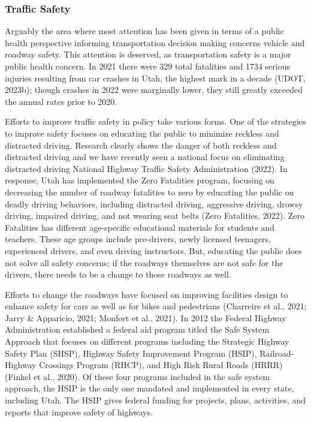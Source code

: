 \documentclass[
  letterpaper,
  authoryear,
  review,
  3p]{elsarticle}
\begin{document}
\hypertarget{traffic-safety}{%
\subsubsection{Traffic Safety}\label{traffic-safety}}

Arguably the area where most attention has been given in terms of a
public health perspective informing transportation decision making
concerns vehicle and roadway safety. This attention is deserved, as
transportation safety is a major public health concern. In 2021 there
were 329 total fatalities and 1734 serious injuries resulting from car
crashes in Utah, the highest mark in a decade (UDOT, 2023b); though
crashes in 2022 were marginally lower, they still greatly exceeded the
annual rates prior to 2020.

Efforts to improve traffic safety in policy take various forms. One of
the strategies to improve safety focuses on educating the public to
minimize reckless and distracted driving. Research clearly shows the
danger of both reckless and distracted driving and we have recently seen
a national focus on eliminating distracted driving National Highway
Traffic Safety Administration (2022). In response, Utah has implemented
the Zero Fatalities program, focusing on decreasing the number of
roadway fatalities to zero by educating the public on deadly driving
behaviors, including distracted driving, aggressive driving, drowsy
driving, impaired driving, and not wearing seat belts (Zero Fatalities,
2022). Zero Fatalities has different age-specific educational materials
for students and teachers. These age groups include pre-drivers, newly
licensed teenagers, experienced drivers, and even driving instructors.
But, educating the public does not solve all safety concerns; if the
roadways themselves are not safe for the drivers, there needs to be a
change to those roadways as well.

Efforts to change the roadways have focused on improving facilities
design to enhance safety for cars as well as for bikes and pedestrians
(Charreire et al., 2021; Jarry \& Apparicio, 2021; Monfort et al.,
2021). In 2012 the Federal Highway Administration established a federal
aid program titled the Safe System Approach that focuses on different
programs including the Strategic Highway Safety Plan (SHSP), Highway
Safety Improvement Program (HSIP), Railroad-Highway Crossings Program
(RHCP), and High Risk Rural Roads (HRRR) (Finkel et al., 2020). Of these
four programs included in the safe system approach, the HSIP is the only
one mandated and implemented in every state, including Utah. The HSIP
gives federal funding for projects, plans, activities, and reports that
improve safety of highways.
\end{document}
